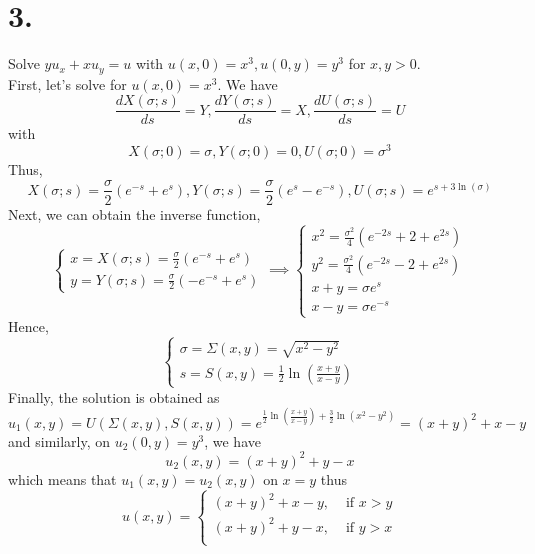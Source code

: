 \documentclass[11pt]{article}
\theoremstyle{mystyle}
\theoremstyle{definition}
\begin{document}
\section*{3.}
Solve $yu_x + xu_y = u$ with $u(x,0) = x^3, u(0,y) = y^3$ for $x,y > 0$. \\ 
First, let's solve for $u(x,0) = x^3$. We have 
\[
  \displaystyle\frac{dX(\sigma; s)}{ds} = Y, 
  \displaystyle\frac{dY(\sigma; s)}{ds} = X, 
  \displaystyle\frac{dU(\sigma; s)}{ds} = U
\]
with 
\[
  X(\sigma;0) = \sigma, Y(\sigma;0) = 0, U(\sigma;0) = \sigma^3
\]
Thus, 
\[
  X(\sigma; s) = \displaystyle\frac{\sigma}{2} (e^{-s} + e^s), Y(\sigma;s) = \displaystyle\frac{\sigma}{2} (e^s - e^{-s}), U(\sigma;s) = e^{s + 3\ln(\sigma)}
\]
Next, we can obtain the inverse function, 
\[
  \begin{cases}
    x = X(\sigma;s) =  \displaystyle\frac{\sigma}{2} (e^{-s} + e^s) \\
    y = Y(\sigma;s) =  \displaystyle\frac{\sigma}{2} (- e^{-s} + e^s)
  \end{cases}
  \implies
  \begin{cases}
    x^2 = \displaystyle\frac{\sigma^2}{4} (e^{-2s} + 2 + e^{2s}) \\
    y^2 = \displaystyle\frac{\sigma^2}{4} (e^{-2s} - 2 + e^{2s}) \\
    x + y = \sigma e^s \\
    x - y = \sigma e^{-s}
  \end{cases}
\]
Hence,  
\[
  \begin{cases}
    \sigma = \Sigma(x,y) = \sqrt{x^2 - y^2} \\
    s = S(x,y) =  \displaystyle\frac{1}{2} \ln \left(\displaystyle\frac{x+y}{x-y} \right)
  \end{cases}
\]
Finally, the solution is obtained as 
\[
  u_1(x,y) = U(\Sigma(x,y), S(x,y)) = e^{\frac{1}{2} \ln\left( \frac{x+y}{x-y}\right) + \frac{3}{2} \ln(x^2-y^2)} = (x+y)^2 + x -y 
\]
and similarly, on $u_2(0,y) = y^3$, we have
\[
  u_2(x,y) = (x+y)^2 + y-x
\]
which means that $u_1(x,y) = u_2(x,y)$ on $x=y$ thus 
\[
  u(x,y) = 
  \begin{cases}
    (x+y)^2 + x - y, &\text{ if } x > y\\
    (x+y)^2 + y - x, &\text{ if } y > x\\ 
  \end{cases}
\]
\pagebreak
\end{document}
